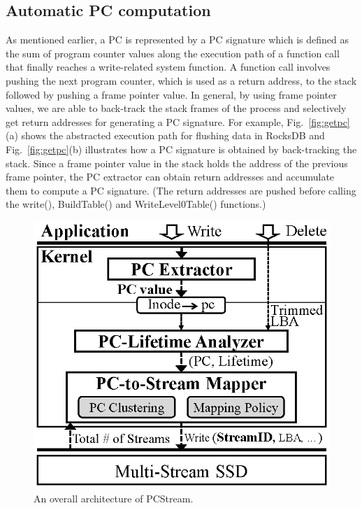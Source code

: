 \subsection{Automatic PC computation}
As mentioned earlier, a PC is represented by a PC signature which is defined as
the sum of program counter values along the execution path of a function call that
finally reaches a write-related system function. A function call involves
pushing the next program counter, which is used as a return address, to the
stack followed by pushing a frame pointer value.  In general, by using frame
pointer values, we are able to back-track the stack frames of the process and
selectively get return addresses for generating a PC signature.  For example,
Fig.~\ref{fig:getpc}(a) shows the abstracted execution path for flushing data
in RocksDB and Fig.~\ref{fig:getpc}(b) illustrates how a PC signature is obtained
by back-tracking the stack.  
Since a frame pointer value in the stack holds the address of the previous
frame pointer, the PC extractor can obtain return addresses and
accumulate them to compute a PC signature. (The return addresses are pushed
before calling the \textsf{\small  write()}, \textsf{\small  BuildTable()} and \textsf{\small 
WriteLevel0Table()} functions.)

\begin{figure}[t]
	\centering
	\vspace{-7pt}
	\includegraphics[width=0.6\linewidth]{figure/architecture4}
	\vspace{-10pt}
	\caption{An overall architecture of \textsf{\small PCStream}.}
	\label{fig:architecture}
	\vspace{-20pt}
\end{figure}


